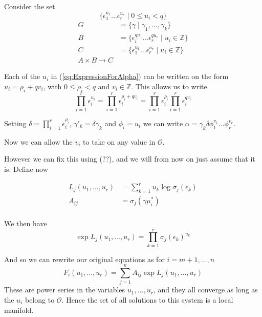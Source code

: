 \documentclass{article}
\newcommand{\mcal}[1]{\mathcal{#1}}
\newcommand{\mbb}[1]{\mathbb{#1}}
\begin{document}
Consider the set $$\{\epsilon_1^{u_1} \dots \epsilon_r^{u_r} \mid 0 \leq u_i < q \}$$
\begin{align*}
    G &= \{\gamma \mid \gamma_1, ..., \gamma_k \} \\
    B &= \{ \epsilon_i^{q u_1} \dots \epsilon_r^{q u_r} \mid u_i \in \mbb Z \} \\
    C &= \{\epsilon_1^{u_1} \dots \epsilon_r^{u_r} \mid u_i \in \mbb Z \} \\ 
    A \times B \to C
\end{align*}

 


Each of the $u_i$ in (\ref{eq:ExpressionForAlpha}) can be written on the form $u_i = \rho_i + qv_i$, with $0 \leq \rho_i < q$ and $v_i \in \mbb{Z}$. This allows us to write 
$$\prod_{i=1}^r \epsilon_i^{u_i} = \prod_{i=1}^r \epsilon_i^{\rho_i + qv_i} = \prod_{i=1}^r \epsilon_i^{\rho_i} \prod_{i=1}^r \epsilon_i^{qv_i}$$ 

Setting $\delta = \prod_{i=1}^r \epsilon_i^{\rho_i}$, $\gamma'_k = \delta \gamma_k$ and $\phi_i = u_i$ we can write $\alpha = \gamma_k \delta \phi_1^{v_1}...\phi_r^{v_r}$. 


Now we can allow the $v_i$ to take on any value in $\mcal O$.



However we can fix this using (??), and we will from now on just assume that it is. Define now

\begin{align*}
    L_j(u_1, ..., u_r) &= \sum_{k = 1}^{r} u_k \log \sigma_j(\epsilon_k) \\
    A_{ij} &= \sigma_j(\gamma \mu_i^*) \\ 
\end{align*}

We then have 
$$\exp L_j (u_1, ..., u_r) = \prod_{k=1}^r \sigma_j(\epsilon_k)^{u_k}$$

And so we can rewrite our original equations as for $i = m+1, ..., n$
$$F_i(u_1, ..., u_r) = \sum_{j = 1}^n A_{ij} \exp L_j(u_1, ..., u_r) $$
These are power series in the variables $u_1, ..., u_r$, and they all converge as long as the $u_i$ belong to $\mcal O$. Hence the set of all solutions to this system is a local manifold. 
\end{document}
